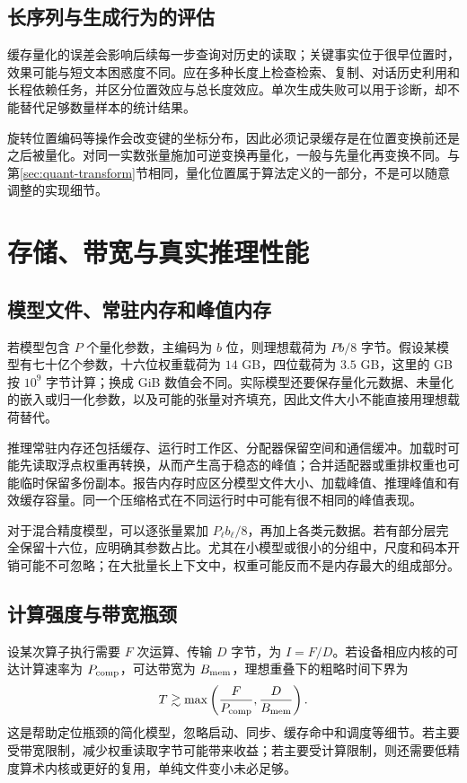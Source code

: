 \documentclass[UTF8,12pt,a4paper,fontset=fandol]{ctexart}
\begin{document}
\subsection{长序列与生成行为的评估}
缓存量化的误差会影响后续每一步查询对历史的读取；关键事实位于很早位置时，效果可能与短文本困惑度不同。应在多种长度上检查检索、复制、对话历史利用和长程依赖任务，并区分位置效应与总长度效应。单次生成失败可以用于诊断，却不能替代足够数量样本的统计结果。

旋转位置编码等操作会改变键的坐标分布，因此必须记录缓存是在位置变换前还是之后被量化。对同一实数张量施加可逆变换再量化，一般与先量化再变换不同。与第\ref{sec:quant-transform}节相同，量化位置属于算法定义的一部分，不是可以随意调整的实现细节。

\section{存储、带宽与真实推理性能}
\label{sec:quant-system}

\subsection{模型文件、常驻内存和峰值内存}
若模型包含 $P$ 个量化参数，主编码为 $b$ 位，则理想载荷为 $Pb/8$ 字节。假设某模型有七十亿个参数，十六位权重载荷为 $14$ GB，四位载荷为 $3.5$ GB，这里的 GB 按 $10^9$ 字节计算；换成 GiB 数值会不同。实际模型还要保存量化元数据、未量化的嵌入或归一化参数，以及可能的张量对齐填充，因此文件大小不能直接用理想载荷替代。

推理常驻内存还包括缓存、运行时工作区、分配器保留空间和通信缓冲。加载时可能先读取浮点权重再转换，从而产生高于稳态的峰值；合并适配器或重排权重也可能临时保留多份副本。报告内存时应区分模型文件大小、加载峰值、推理峰值和有效缓存容量。同一个压缩格式在不同运行时中可能有很不相同的峰值表现。

对于混合精度模型，可以逐张量累加 $P_\ell b_\ell/8$，再加上各类元数据。若有部分层完全保留十六位，应明确其参数占比。尤其在小模型或很小的分组中，尺度和码本开销可能不可忽略；在大批量长上下文中，权重可能反而不是内存最大的组成部分。

\subsection{计算强度与带宽瓶颈}
设某次算子执行需要 $F$ 次运算、传输 $D$ 字节，为 $I=F/D$。若设备相应内核的可达计算速率为 $P_{\rm comp}$，可达带宽为 $B_{\rm mem}$，理想重叠下的粗略时间下界为
\begin{equation}
 T\gtrsim\max\left(\frac{F}{P_{\rm comp}},\frac{D}{B_{\rm mem}}\right).
 \label{eq:quant-roofline}
\end{equation}
这是帮助定位瓶颈的简化模型，忽略启动、同步、缓存命中和调度等细节。若主要受带宽限制，减少权重读取字节可能带来收益；若主要受计算限制，则还需要低精度算术内核或更好的复用，单纯文件变小未必足够。
\end{document}
